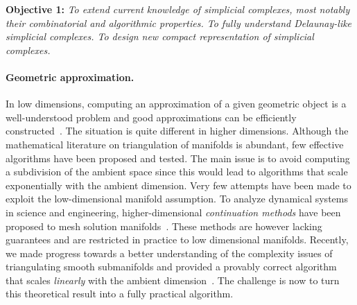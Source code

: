
\vspace{2mm}

{\bf Objective 1:} {\em 
To extend  current knowledge of simplicial complexes, most notably their combinatorial and algorithmic properties.   To fully understand Delaunay-like simplicial complexes.  To design new  compact representation of simplicial complexes.}

\paragraph{Geometric approximation.}
In low dimensions, computing an approximation of a given geometric
object is a well-understood problem and good approximations can be
efficiently constructed~\cite{geometrica-bcmrv-ms-06,he-gtmg-2001}.
The situation is quite different in higher dimensions.  Although the
mathematical literature on triangulation of manifolds is abundant, few
effective algorithms have been proposed and tested.  The main issue is
to avoid computing a subdivision of the ambient space since this would lead to algorithms that scale exponentially with the ambient dimension. Very few attempts have been made to exploit the  low-dimensional manifold assumption.
To analyze {dynamical systems} in science and engineering, higher-dimensional {\em continuation methods} have been proposed to mesh solution manifolds~\cite{mh-mpc-2002}. These methods are however lacking guarantees and are restricted in practice to low dimensional manifolds. 
Recently, we made progress towards a better understanding of the complexity issues of triangulating smooth submanifolds and provided a provably correct algorithm that scales {\em linearly} with the ambient dimension~\cite{boissonnat2010meshing}. 
The challenge is now to turn this theoretical result into a fully practical algorithm.

